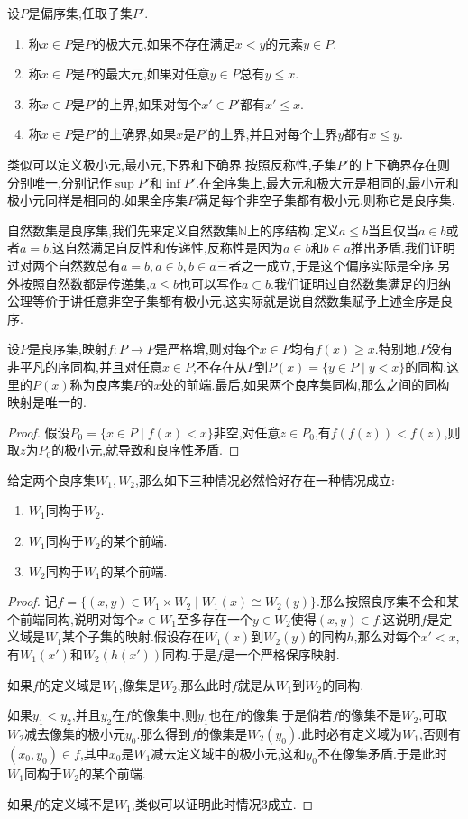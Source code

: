 设$P$是偏序集,任取子集$P'$.
\begin{enumerate}
	\item 称$x\in P$是$P$的极大元,如果不存在满足$x<y$的元素$y\in P$.
	\item 称$x\in P$是$P$的最大元,如果对任意$y\in P$总有$y\le x$.
	\item 称$x\in P$是$P'$的上界,如果对每个$x'\in P'$都有$x'\le x$.
	\item 称$x\in P$是$P'$的上确界,如果$x$是$P'$的上界,并且对每个上界$y$都有$x\le y$.
\end{enumerate}

类似可以定义极小元,最小元,下界和下确界.按照反称性,子集$P'$的上下确界存在则分别唯一,分别记作$\sup P'$和$\inf P'$.在全序集上,最大元和极大元是相同的,最小元和极小元同样是相同的.如果全序集$P$满足每个非空子集都有极小元,则称它是良序集.

自然数集是良序集,我们先来定义自然数集$\mathbb{N}$上的序结构.定义$a\le b$当且仅当$a\in b$或者$a=b$.这自然满足自反性和传递性,反称性是因为$a\in b$和$b\in a$推出矛盾.我们证明过对两个自然数总有$a=b,a\in b,b\in a$三者之一成立,于是这个偏序实际是全序.另外按照自然数都是传递集,$a\le b$也可以写作$a\subset b$.我们证明过自然数集满足的归纳公理等价于讲任意非空子集都有极小元,这实际就是说自然数集赋予上述全序是良序.

设$P$是良序集,映射$f:P\to P$是严格增,则对每个$x\in P$均有$f(x)\ge x$.特别地,$P$没有非平凡的序同构,并且对任意$x\in P$,不存在从$P$到$P(x)=\{y\in P\mid y<x\}$的同构.这里的$P(x)$称为良序集$P$的$x$处的前端.最后,如果两个良序集同构,那么之间的同构映射是唯一的.
\begin{proof}
	
	假设$P_0=\{x\in P\mid f(x)<x\}$非空,对任意$z\in P_0$,有$f(f(z))<f(z)$,则取$z$为$P_0$的极小元,就导致和良序性矛盾.
\end{proof}

给定两个良序集$W_1,W_2$,那么如下三种情况必然恰好存在一种情况成立:
\begin{enumerate}
	\item $W_1$同构于$W_2$.
	\item $W_1$同构于$W_2$的某个前端.
	\item $W_2$同构于$W_1$的某个前端.
\end{enumerate}
\begin{proof}
	
	记$f=\{(x,y)\in W_1\times W_2\mid W_1(x)\cong W_2(y)\}$.那么按照良序集不会和某个前端同构,说明对每个$x\in W_1$至多存在一个$y\in W_2$使得$(x,y)\in f$.这说明$f$是定义域是$W_1$某个子集的映射.假设存在$W_1(x)$到$W_2(y)$的同构$h$,那么对每个$x'<x$,有$W_1(x')$和$W_2(h(x'))$同构.于是$f$是一个严格保序映射.
	
	如果$f$的定义域是$W_1$,像集是$W_2$,那么此时$f$就是从$W_1$到$W_2$的同构.

    如果$y_1<y_2$,并且$y_2$在$f$的像集中,则$y_1$也在$f$的像集.于是倘若$f$的像集不是$W_2$,可取$W_2$减去像集的极小元$y_0$.那么得到$f$的像集是$W_2(y_0)$.此时必有定义域为$W_1$,否则有$(x_0,y_0)\in f$,其中$x_0$是$W_1$减去定义域中的极小元,这和$y_0$不在像集矛盾.于是此时$W_1$同构于$W_2$的某个前端.
    
    如果$f$的定义域不是$W_1$,类似可以证明此时情况3成立.
\end{proof}

